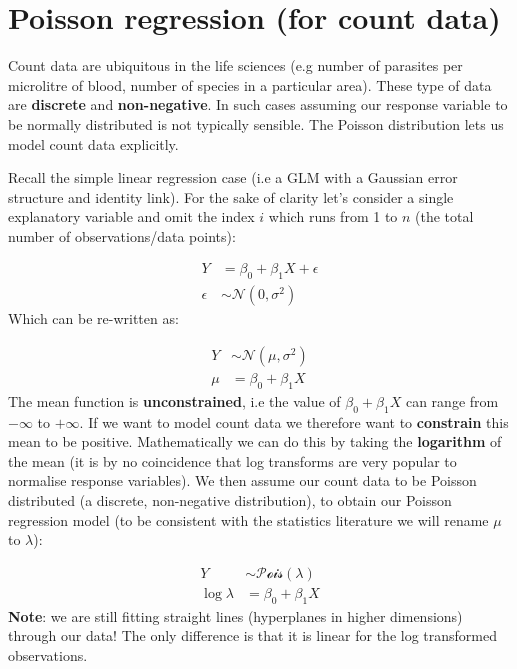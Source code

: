 \documentclass[]{book}
\theoremstyle{definition}
\theoremstyle{definition}
\theoremstyle{definition}
\theoremstyle{remark}
\begin{document}
\section{Poisson regression (for count
data)}\label{poisson-regression-for-count-data}

Count data are ubiquitous in the life sciences (e.g number of parasites
per microlitre of blood, number of species in a particular area). These
type of data are \textbf{discrete} and \textbf{non-negative}. In such
cases assuming our response variable to be normally distributed is not
typically sensible. The Poisson distribution lets us model count data
explicitly.

Recall the simple linear regression case (i.e a GLM with a Gaussian
error structure and identity link). For the sake of clarity let's
consider a single explanatory variable and omit the index \(i\) which
runs from 1 to \(n\) (the total number of observations/data points):

\[
\begin{aligned}
Y & = \beta_0 + \beta_1X + \epsilon \\
\epsilon & \sim \mathcal{N}(0, \sigma^2)
\end{aligned}
\] Which can be re-written as:

\[
\begin{aligned}
Y & \sim \mathcal{N}(\mu, \sigma^2) \\
\mu & = \beta_0 + \beta_1X
\end{aligned}
\] The mean function is \textbf{unconstrained}, i.e the value of
\(\beta_0 + \beta_1X\) can range from \(-\infty\) to \(+\infty\). If we
want to model count data we therefore want to \textbf{constrain} this
mean to be positive. Mathematically we can do this by taking the
\textbf{logarithm} of the mean (it is by no coincidence that log
transforms are very popular to normalise response variables). We then
assume our count data to be Poisson distributed (a discrete,
non-negative distribution), to obtain our Poisson regression model (to
be consistent with the statistics literature we will rename \(\mu\) to
\(\lambda\)):

\[
\begin{aligned}
Y & \sim \mathcal{Pois}(\lambda) \\
\log{\lambda} & = \beta_0 + \beta_1X
\end{aligned}
\] \textbf{Note}: we are still fitting straight lines (hyperplanes in
higher dimensions) through our data! The only difference is that it is
linear for the log transformed observations.
\end{document}
